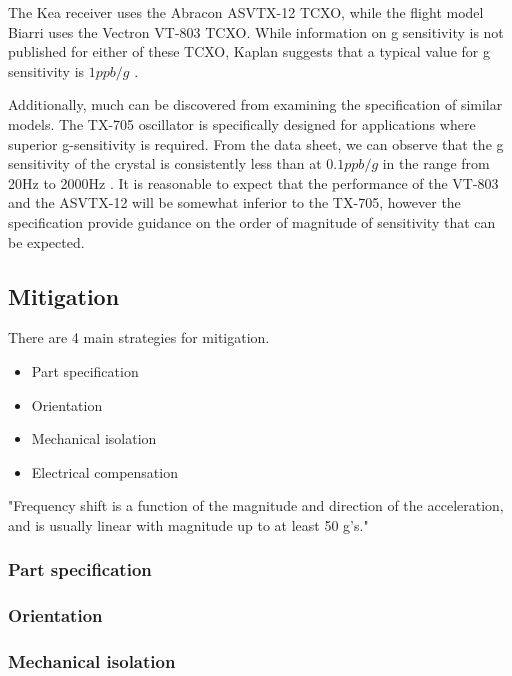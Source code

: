 \begin{comment}
http://www.vectron.com/products/g_sensitivity/Vig-tutorial%
\end{comment}

The  Kea receiver uses the Abracon ASVTX-12 \ac{TCXO}\cite{ASTX12Datasheet}, while the flight model Biarri uses the Vectron  VT-803 TCXO\cite{VT803Datasheet}. While information on g sensitivity is not published for either of these \ac{TCXO}, 
Kaplan suggests that a typical value for g sensitivity is $1 ppb/g$ \cite{Kaplan}.

Additionally, much can be discovered from examining the specification of similar models. The TX-705 oscillator is specifically designed for applications where superior g-sensitivity is required. From the data sheet, we can observe that the g sensitivity of the crystal is consistently less than at $0.1ppb/g$ in the range from 20Hz to 2000Hz \cite{TX705Datasheet}. It is reasonable to expect that the performance of the VT-803 and the ASVTX-12 will be somewhat inferior to the TX-705, however the specification provide guidance on the order of magnitude of sensitivity that can be expected.

\subsection{Mitigation}
There are 4 main strategies for mitigation.

\begin{itemize}
\item{Part specification}
\item{Orientation}
\item{Mechanical isolation}
\item{Electrical compensation}
\end{itemize}

"Frequency shift is a function of the magnitude and direction of the
acceleration, and is usually linear with magnitude up to at least 50 g's."
\cite{CrystalVibration}


\subsubsection{Part specification}
\subsubsection{Orientation}
\subsubsection{Mechanical isolation}
